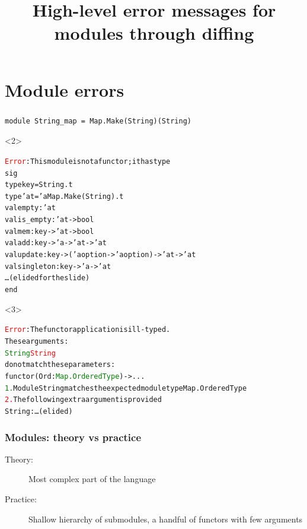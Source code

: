 \documentclass[11pt,aspectratio=169]{beamer}
\title[Functor diffing]{High-level error messages for modules through diffing}
\author[Angeletti \& Radanne]{\texorpdfstring{
  \begin{columns}\column{0.5\linewidth}\centering%
  Florian \textsc{Angeletti}\\
  Inria\\
  \href{mailto:florian.angeletti@inria.fr}
  {\nolinkurl{florian.angeletti@inria.fr}}
  \column{0.5\linewidth}\centering%
  Gabriel \textsc{Radanne}\\
  Inria\\
  \href{mailto:gabriel.radanne@inria.fr}
  {\nolinkurl{gabriel.radanne@inria.fr}}
  \end{columns}
  }{F. Angeletti \& G. Radanne}}
\date{}
\newcommand{\error}[1]{\textcolor{red}{#1}}
\newcommand{\ok}[1]{\textcolor{green}{#1}}
\begin{document}
\begin{frame}
\maketitle
\end{frame}

\section{Module errors}


\begin{frame}[fragile,t]\frametitle{}

\begin{verbatim}
module String_map = Map.Make(String)(String)
\end{verbatim}
\begin{onlyenv}<2>
\begin{alltt}
\error{Error}: This module is not a functor; it has type
       sig
         type key = String.t
         type 'a t = 'a Map.Make(String).t
         val empty : 'a t
         val is_empty : 'a t -> bool
         val mem : key -> 'a t -> bool
         val add : key -> 'a -> 'a t -> 'a t
         val update : key -> ('a option -> 'a option) -> 'a t -> 'a t
         val singleton : key -> 'a -> 'a t
        \dots(elided for the slide)
       end
\end{alltt}
\end{onlyenv}

\begin{onlyenv}<3>
\begin{alltt}\error{Error}: The functor application is ill-typed.
       These arguments:
         \ok{String} \error{String}
       do not match these parameters:
         functor (Ord : \ok{Map.OrderedType})  -> ...
  \ok{1.} Module String matches the expected module type Map.OrderedType
  \error{2.} The following extra argument is provided
         String : \dots(elided)
\end{alltt}
\end{onlyenv}

\end{frame}


\begin{frame}\frametitle{Modules: theory vs practice}
\begin{description}
\item[Theory:]{Most complex part of the language}
\item[Practice:]{Shallow hierarchy of submodules, a handful of functors with few arguments}
\end{description}

\end{frame}
\end{document}
